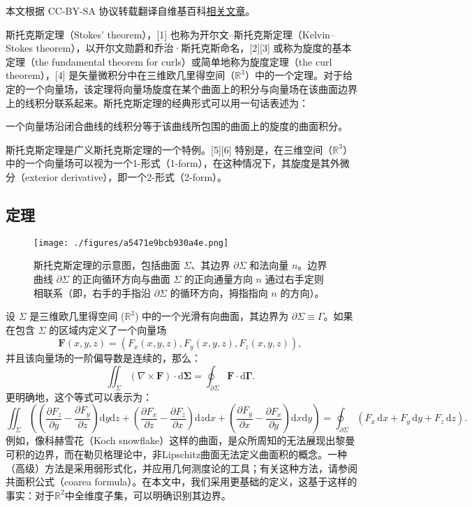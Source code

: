 
本文根据 CC-BY-SA 协议转载翻译自维基百科\href{https://en.wikipedia.org/wiki/Stokes\%27_theorem}{相关文章}。

斯托克斯定理（Stokes' theorem），[1] 也称为开尔文–斯托克斯定理（Kelvin–Stokes theorem），以开尔文勋爵和乔治·斯托克斯命名，[2][3] 或称为旋度的基本定理（the fundamental theorem for curls）或简单地称为旋度定理（the curl theorem），[4] 是矢量微积分中在三维欧几里得空间（\(\mathbb{R}^3\)）中的一个定理。对于给定的一个向量场，该定理将向量场旋度在某个曲面上的积分与向量场在该曲面边界上的线积分联系起来。斯托克斯定理的经典形式可以用一句话表述为：

一个向量场沿闭合曲线的线积分等于该曲线所包围的曲面上的旋度的曲面积分。

斯托克斯定理是广义斯托克斯定理的一个特例。[5][6] 特别是，在三维空间（\(\mathbb{R}^3\)）中的一个向量场可以视为一个1-形式（1-form），在这种情况下，其旋度是其外微分（exterior derivative），即一个2-形式（2-form）。
\subsection{定理}
\begin{figure}[ht]
\centering
\texttt{[image: ./figures/a5471e9bcb930a4e.png]}
\caption{斯托克斯定理的示意图，包括曲面 \(\Sigma\)、其边界 \(\partial\Sigma\) 和法向量 \(n\)。边界曲线 \(\partial\Sigma\) 的正向循环方向与曲面 \(\Sigma\) 的正向通量方向 \(n\) 通过右手定则相联系（即，右手的手指沿 \(\partial\Sigma\) 的循环方向，拇指指向 \(n\) 的方向）。} \label{fig_STKS_1}
\end{figure}
设 \(\Sigma\) 是三维欧几里得空间 (\(\mathbb{R}^3\)) 中的一个光滑有向曲面，其边界为 \(\partial \Sigma \equiv \Gamma\)。如果在包含 \(\Sigma\) 的区域内定义了一个向量场 
\[
\mathbf{F}(x, y, z) = (F_x(x, y, z), F_y(x, y, z), F_z(x, y, z)),~
\]
并且该向量场的一阶偏导数是连续的，那么：
\[
\iint_{\Sigma} (\nabla \times \mathbf{F}) \cdot \mathrm{d} \mathbf{\Sigma} = \oint_{\partial \Sigma} \mathbf{F} \cdot \mathrm{d} \mathbf{\Gamma}.~
\]
更明确地，这个等式可以表示为：
\[
\iint_{\Sigma} \left( 
\left( \frac{\partial F_z}{\partial y} - \frac{\partial F_y}{\partial z} \right) \mathrm{d}y \mathrm{d}z 
+ \left( \frac{\partial F_x}{\partial z} - \frac{\partial F_z}{\partial x} \right) \mathrm{d}z \mathrm{d}x 
+ \left( \frac{\partial F_y}{\partial x} - \frac{\partial F_x}{\partial y} \right) \mathrm{d}x \mathrm{d}y 
\right)
=
\oint_{\partial \Sigma} \left( 
F_x \, \mathrm{d}x + F_y \, \mathrm{d}y + F_z \, \mathrm{d}z 
\right).~
\]
例如，像科赫雪花（Koch snowflake）这样的曲面，是众所周知的无法展现出黎曼可积的边界，而在勒贝格理论中，非Lipschitz曲面无法定义曲面积的概念。一种（高级）方法是采用弱形式化，并应用几何测度论的工具；有关这种方法，请参阅共面积公式（coarea formula）。在本文中，我们采用更基础的定义，这基于这样的事实：对于\(\mathbb{R}^2\)中全维度子集，可以明确识别其边界。

